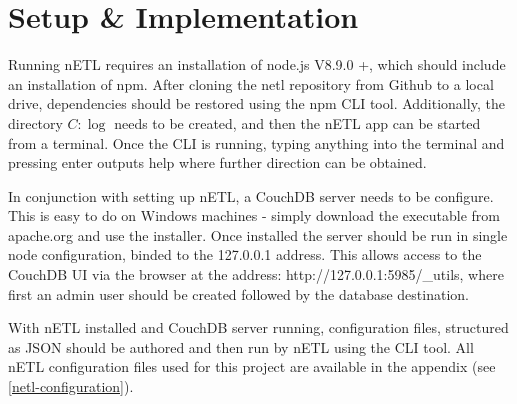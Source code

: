 \section{Setup \& Implementation}
Running nETL requires an installation of node.js V8.9.0 +, which should include an installation of npm. After cloning the netl repository from Github to a local drive, dependencies should be restored using the npm CLI tool. Additionally, the directory $C:\log$ needs to be created, and then the nETL app can be started from a terminal. Once the CLI is running, typing anything into the terminal and pressing enter outputs help where further direction can be obtained.

In conjunction with setting up nETL, a CouchDB server needs to be configure. This is easy to do on Windows machines - simply download the executable from apache.org and use the installer. Once installed the server should be run in single node configuration, binded to the 127.0.0.1 address. This allows access to the CouchDB UI via the browser at the address: http://127.0.0.1:5985/\_utils, where first an admin user should be created followed by the database destination.

With nETL installed and CouchDB server running, configuration files, structured as JSON should be authored and then run by nETL using the CLI tool. All nETL configuration files used for this project are available in the appendix (see \ref{netl-configuration}).